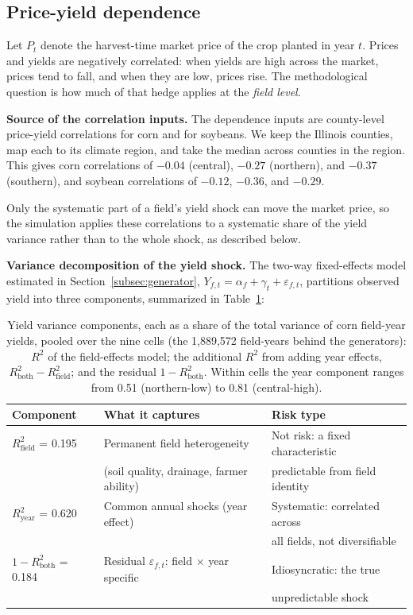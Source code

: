 \documentclass[11pt,letterpaper]{article}
\theoremstyle{remark}
\begin{document}
\subsection{\label{subsec:py_corr}Price-yield dependence}
 
Let $P_t$ denote the harvest-time market price of the crop planted in year $t$. Prices and yields are negatively correlated: when yields are high across the market, prices tend to fall, and when they are low, prices rise. The methodological question is how much of that hedge applies at the \textit{field level}.
 
\textbf{Source of the correlation inputs.} The dependence inputs are county-level price-yield correlations for corn and for soybeans. We keep the Illinois counties, map each to its climate region, and take the median across counties in the region. This gives corn correlations of $-0.04$ (central), $-0.27$ (northern), and $-0.37$ (southern), and soybean correlations of $-0.12$, $-0.36$, and $-0.29$.
 
Only the systematic part of a field's yield shock can move the market price, so the simulation applies these correlations to a systematic share of the yield variance rather than to the whole shock, as described below.
 
\textbf{Variance decomposition of the yield shock.} The two-way fixed-effects model estimated in Section~\ref{subsec:generator}, $Y_{f,t} = \alpha_f + \gamma_t + \varepsilon_{f,t}$, partitions observed yield into three components, summarized in Table~\ref{tab:decomp}:
 
\begin{table}[H]
\centering
\begin{tabular}{lll}
\toprule
\textbf{Component} & \textbf{What it captures} & \textbf{Risk type}\\
\midrule
$R^2_{\text{field}}$ = 0.195 & Permanent field heterogeneity & Not risk: a fixed characteristic\\
& (soil quality, drainage, farmer ability) & predictable from field identity\\
$R^2_{\text{year}}$ = 0.620 & Common annual shocks (year effect) & Systematic: correlated across \\
& & all fields, not diversifiable\\
$1 - R^2_{\text{both}}$ = 0.184 & Residual $\varepsilon_{f,t}$: field $\times$ year specific & Idiosyncratic: the true\\
& & unpredictable shock\\
\bottomrule
\end{tabular}
\caption{Yield variance components, each as a share of the total variance of corn field-year yields, pooled over the nine cells (the 1,889,572 field-years behind the generators): $R^2$ of the field-effects model; the additional $R^2$ from adding year effects, $R^2_{\text{both}} - R^2_{\text{field}}$; and the residual $1 - R^2_{\text{both}}$. Within cells the year component ranges from 0.51 (northern-low) to 0.81 (central-high).}
\label{tab:decomp}
\end{table}
 
\end{document}
